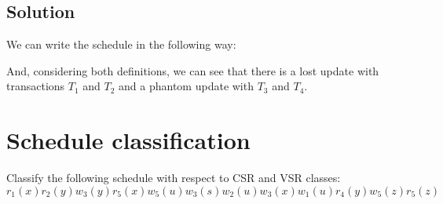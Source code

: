 \documentclass[12pt, a4paper]{report}
\newtheorem[style=M,bodystyle=\normalfont]{theorem}{Theorem}
\newtheorem[style=M,bodystyle=\normalfont]{corollary}{Corollary}
\newtheorem[style=M,bodystyle=\normalfont]{lemma}{Lemma}
\newtheorem[style=M,bodystyle=\normalfont]{definition}{Definition}
\begin{document}
    \subsection*{Solution}
        We can write the schedule in the following way:
        \begin{table}[H]
            \centering
        \end{table}
        And, considering both definitions,  we can see that there is a lost update with transactions $T_1$ and $T_2$ and a phantom update with $T_3$ and $T_4$. 

    \newpage
    
    \section{Schedule classification}
        Classify the following schedule with respect to CSR and VSR classes: 
        \[r_1(x) r_2(y) w_3(y) r_5(x) w_5(u) w_3(s)w_2(u) w_3(x) w_1(u) r_4(y) w_5(z) r_5(z)\]
\end{document}
